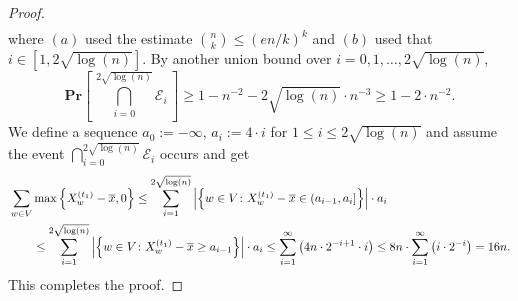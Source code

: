 \documentclass[10pt,a4paper]{amsart}
\newcommand{\Pro}[1]{\mathbf{Pr} \left[\,#1\,\right]}
\begin{document}
\begin{proof}
\begin{align*}
\end{align*}
where $(a)$ used the estimate $\binom{n}{k} \leq (en/k)^k$ and $(b)$ used that $i \in [1, 2\sqrt{\log(n)} ]$.
By another union bound over $i=0,1,\ldots,2\sqrt{\log(n)} $,
\[
\Pro{ \bigcap_{i=0}^{2\sqrt{\log(n)}} \mathcal{E}_i } \geq 1 - n^{-2} - 2\sqrt{\log(n)} \cdot n^{-3} \geq 1 - 2\cdot n^{-2}.
\]
We define a sequence $a_0 := -\infty$, $a_i:= 4 \cdot i$ for $1 \leq i \leq 2\sqrt{\log(n)}$ and assume the event $\bigcap_{i=0}^{2\sqrt{\log(n)}} \mathcal{E}_i $ occurs and get
\begin{align*}
\MoveEqLeft\sum_{w \in V} \max \left\{ X_w^{(t_1)} - \overline{x}, 0 \right\} \leq
\sum_{i=1}^{2\sqrt{\log(n)}} \left| \left\{ w \in V \colon X_w^{(t_1)} - \overline{x} \in (a_{i-1}, a_{i} ] \right\} \right| \cdot a_i \\
&\leq
\sum_{i=1}^{2\sqrt{\log(n)}} \left| \left\{ w \in V \colon X_w^{(t_1)} - \overline{x} \geq a_{i-1} \right\} \right| \cdot a_i \leq \sum_{i=1}^{\infty} \left( 4n \cdot 2^{-i+1} \cdot i \right)
\leq 8 n\cdot \sum_{i=1}^{\infty} \left( i \cdot 2^{-i} \right)
= 16 n.
\end{align*}
This completes the proof.
\end{proof}
\end{document}
